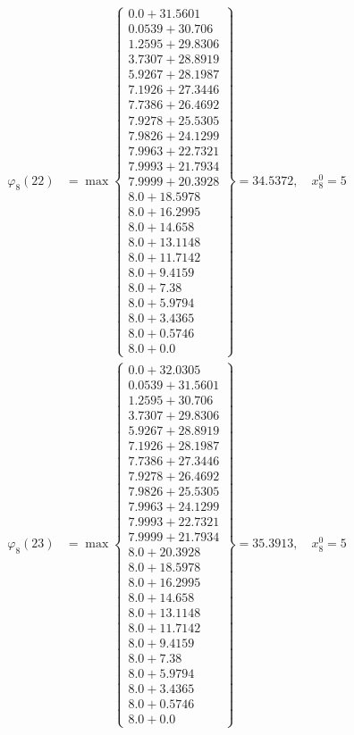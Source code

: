 \documentclass{article}
\begin{document}
\begin{align*}
\varphi_{8}(22) &= \max \left\{ \begin{array}{c}
0.0 + 31.5601 \\
 0.0539 + 30.706 \\
 1.2595 + 29.8306 \\
 3.7307 + 28.8919 \\
 5.9267 + 28.1987 \\
 7.1926 + 27.3446 \\
 7.7386 + 26.4692 \\
 7.9278 + 25.5305 \\
 7.9826 + 24.1299 \\
 7.9963 + 22.7321 \\
 7.9993 + 21.7934 \\
 7.9999 + 20.3928 \\
 8.0 + 18.5978 \\
 8.0 + 16.2995 \\
 8.0 + 14.658 \\
 8.0 + 13.1148 \\
 8.0 + 11.7142 \\
 8.0 + 9.4159 \\
 8.0 + 7.38 \\
 8.0 + 5.9794 \\
 8.0 + 3.4365 \\
 8.0 + 0.5746 \\
 8.0 + 0.0
\end{array} \right\}=34.5372, \quad x_{8}^0=5\\
  
\varphi_{8}(23) &= \max \left\{ \begin{array}{c}
0.0 + 32.0305 \\
 0.0539 + 31.5601 \\
 1.2595 + 30.706 \\
 3.7307 + 29.8306 \\
 5.9267 + 28.8919 \\
 7.1926 + 28.1987 \\
 7.7386 + 27.3446 \\
 7.9278 + 26.4692 \\
 7.9826 + 25.5305 \\
 7.9963 + 24.1299 \\
 7.9993 + 22.7321 \\
 7.9999 + 21.7934 \\
 8.0 + 20.3928 \\
 8.0 + 18.5978 \\
 8.0 + 16.2995 \\
 8.0 + 14.658 \\
 8.0 + 13.1148 \\
 8.0 + 11.7142 \\
 8.0 + 9.4159 \\
 8.0 + 7.38 \\
 8.0 + 5.9794 \\
 8.0 + 3.4365 \\
 8.0 + 0.5746 \\
 8.0 + 0.0
\end{array} \right\}=35.3913, \quad x_{8}^0=5\\
  

\end{align*}
\end{document}
